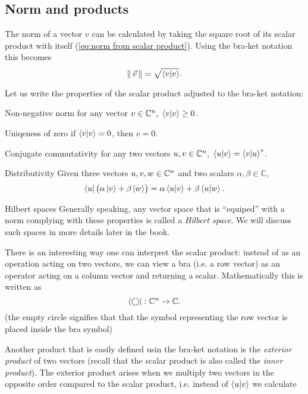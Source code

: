 \subsection{Norm and products}
The norm of a vector $v$ can be calculated by taking the square root of its scalar product with itself (\autoref{eq:norm from scalar product}). Using the bra-ket notation this becomes
\begin{equation}
	\norm{v} = \sqrt{\innerproduct{v}}.
	\label{eq:norm_braket}
\end{equation}

Let us write the properties of the scalar product adjusted to the bra-ket notation:
\begin{descitemize}
	\item[Non-negative norm] for any vector $v\in\Cs{n},\ \innerproduct{v}\geq0$.
	\item[Uniqeness of zero] if $\innerproduct{v}=0$, then $v=0$.
	\item[Conjugate commutativity] for any two vectors $u,v\in\Cs{n},\ \innerproduct{u}{v}=\sconj{\innerproduct{v}{u}}$.
	\item[Distributivity] Given three vectors $u,v,w\in\mathbb{C}^{n}$ and two scalars $\alpha,\beta\in\mathbb{C}$,
		\[
			\bra{u} \left( \alpha\ket{v}+\beta\ket{w} \right) = \alpha\innerproduct{u}{v} + \beta\innerproduct{u}{w}.
		\]
\end{descitemize}

\begin{note}{Hilbert spaces}
Generally speaking, any vector space that is ``equiped'' with a norm complying with these properties is called a \emph{Hilbert space}. We will discuss such spaces in more details later in the book.
\end{note}

There is an interesting way one can interpret the scalar product: instead of as an operation acting on two vectors, we can view a bra (i.e. a row vector) as an operator acting on a column vector and returning a scalar. Mathematically this is written as
\begin{equation}
	\bra{\bigcirc}: \mathbb{C}^{n}\to\mathbb{C}.
	\label{eq:bra_as_operator}
\end{equation}
(the empty circle signifies that that the symbol representing the row vector is placed inside the bra symbol)


Another product that is easily defined usin the bra-ket notation is the \emph{exterior product} of two vectors (recall that the scalar product is also called the \textit{inner product}). The exterior product arises when we multiply two vectors in the opposite order compared to the scalar product, i.e. instead of $\innerproduct{u}{v}$ we calculate
